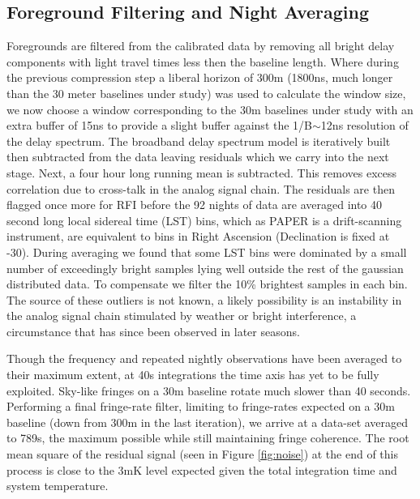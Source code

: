 \documentclass{aastex}
\begin{document}
\subsection{Foreground Filtering and Night Averaging}
Foregrounds are filtered from the calibrated data by removing all bright delay components with light travel times less then the baseline length. Where during the previous compression step a liberal horizon of 300m (1800ns, much longer than the 30 meter baselines under study)  was used to calculate the window size, we now choose a window corresponding to the 30m baselines under study with an extra buffer of 15ns to provide a slight buffer against the 1/B$\sim$12ns resolution of the delay spectrum.  The broadband delay spectrum model is iteratively built then subtracted from the data leaving residuals which we carry into the next stage. Next, a four hour long running mean is subtracted. This removes excess correlation due to cross-talk in the analog signal chain. The residuals are then flagged once more for RFI before the 92 nights of data are averaged into 40 second long local sidereal time (LST) bins, which as PAPER is a drift-scanning instrument, are equivalent to bins in Right Ascension (Declination is fixed at -30\arcdeg).  During averaging we found that some LST bins were dominated by a small number of exceedingly bright samples lying well outside the rest of the gaussian distributed data. To compensate we filter the 10\% brightest samples in each bin.  The source of these outliers is not known,  a likely possibility is an instability in the analog signal chain stimulated by weather or bright interference, a circumstance that has since been observed in later seasons. 


Though the frequency and repeated nightly observations have been averaged to their maximum extent, at 40s integrations the time axis has yet to be fully exploited.  Sky-like fringes on a 30m baseline rotate much slower than 40 seconds.  Performing a final fringe-rate filter, limiting to fringe-rates expected on a 30m baseline (down from 300m in the last iteration), we arrive at a data-set averaged to 789s, the maximum possible while still maintaining fringe coherence.    The root mean square of the residual signal (seen in Figure \ref{fig:noise}) at the end of this process is close to the 3mK level expected given the total integration time and  system temperature.  

\end{document}

